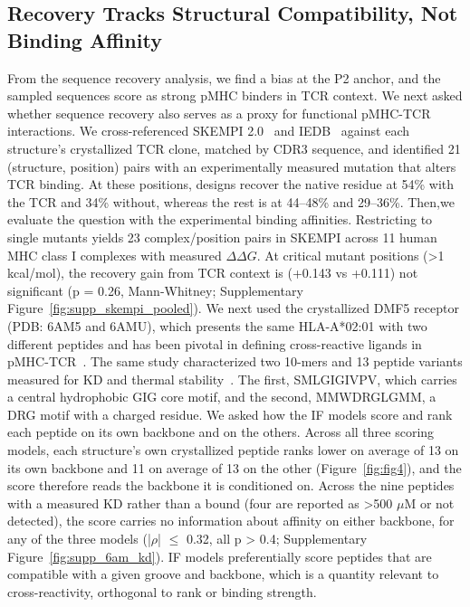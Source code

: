 \documentclass{article}
\begin{document}
\subsection{Recovery Tracks Structural Compatibility, Not Binding Affinity}
\label{sec:skempi}
From the sequence recovery analysis, we find a bias at the P2 anchor, and the sampled sequences score as strong pMHC binders in TCR context. We next asked whether sequence recovery also serves as a proxy for functional pMHC-TCR interactions. We cross-referenced SKEMPI 2.0~\citep{jankauskaite2019skempi} and IEDB~\citep{vita2019iedb} against each structure's crystallized TCR clone, matched by CDR3 sequence, and identified 21 (structure, position) pairs with an experimentally measured mutation that alters TCR binding. At these positions, designs recover the native residue at 54\% with the TCR and 34\% without, whereas the rest is at 44--48\% and 29--36\%. 
Then,we evaluate the question with the experimental binding affinities. Restricting to single mutants yields 23 complex/position pairs in SKEMPI across 11 human MHC class I complexes with measured $\Delta\Delta G$. At critical mutant positions (>1 kcal/mol), the recovery gain from TCR context is (+0.143 vs +0.111) not significant (p = 0.26, Mann-Whitney; Supplementary Figure~\ref{fig:supp_skempi_pooled}).
We next used the crystallized DMF5 receptor (PDB: 6AM5 and 6AMU), which presents the same HLA-A*02:01 with two different peptides and has been pivotal in defining cross-reactive ligands in pMHC-TCR~\citep{riley2018dmf5adaptability}. The same study characterized two 10-mers and 13 peptide variants measured for KD and thermal stability~\citep{riley2018dmf5adaptability}. The first, SMLGIGIVPV, which carries a central hydrophobic GIG core motif, and the second, MMWDRGLGMM, a DRG motif with a charged residue. We asked how the IF models score and rank each peptide on its own backbone and on the others. Across all three scoring models, each structure's own crystallized peptide ranks lower on average of 13 on its own backbone and 11 on average of 13 on the other (Figure~\ref{fig:fig4}), and the score therefore reads the backbone it is conditioned on. Across the nine peptides with a measured KD rather than a bound (four are reported as >500 $\mu$M or not detected), the score carries no information about affinity on either backbone, for any of the three models (|$\rho$| $\leq$ 0.32, all p > 0.4; Supplementary Figure~\ref{fig:supp_6am_kd}). IF models preferentially score peptides that are compatible with a given groove and backbone, which is a quantity relevant to cross-reactivity, orthogonal to rank or binding strength.
\end{document}
